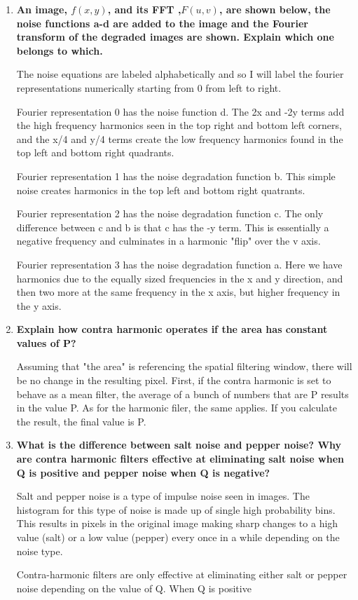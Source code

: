 \begin{enumerate}[font=\bfseries]
\begin{enumerate}[font=\bfseries, label=\alph*.]
    \end{enumerate}

    \item \textbf{An image, $f(x,y)$, and its FFT ,$F(u,v)$, are shown below,
    the noise functions a-d are added to the image and the Fourier transform of
    the degraded images are shown. Explain which one belongs to which.}

    The noise equations are labeled alphabetically and so I will label the
    fourier representations numerically starting from 0 from left to right. 

    Fourier representation 0 has the noise function d. The 2x and -2y terms add
    the high frequency harmonics seen in the top right and bottom left corners,
    and the x/4 and y/4 terms create the low frequency harmonics found in the
    top left and bottom right quadrants.

    Fourier representation 1 has the noise degradation function b. This simple
    noise creates harmonics in the top left and bottom right quatrants.

    Fourier representation 2 has the noise degradation function c. The only
    difference between c and b is that c has the -y term. This is essentially a
    negative frequency and culminates in a harmonic "flip" over the v axis.

    Fourier representation 3 has the noise degradation function a. Here we have
    harmonics due to the equally sized frequencies in the x and y direction, and
    then two more at the same frequency in the x axis, but higher frequency in
    the y axis.

    \item \textbf{Explain how contra harmonic operates if the area has constant
    values of P?}

    Assuming that "the area" is referencing the spatial filtering window, there
    will be no change in the resulting pixel. First, if the contra harmonic is
    set to behave as a mean filter, the average of a bunch of numbers that are P
    results in the value P. As for the harmonic filer, the same applies. If you
    calculate the result, the final value is P.

    \item \textbf{What is the difference between salt noise and pepper noise?
    Why are contra harmonic filters effective at eliminating salt noise when Q
    is positive and pepper noise when Q is negative?}

    Salt and pepper noise is a type of impulse noise seen in images. The
    histogram for this type of noise is made up of single high probability bins.
    This results in pixels in the original image making sharp changes to a high
    value (salt) or a low value (pepper) every once in a while depending on the
    noise type.

    Contra-harmonic filters are only effective at eliminating either salt or
    pepper noise depending on the value of Q. When Q is positive


\end{enumerate}
